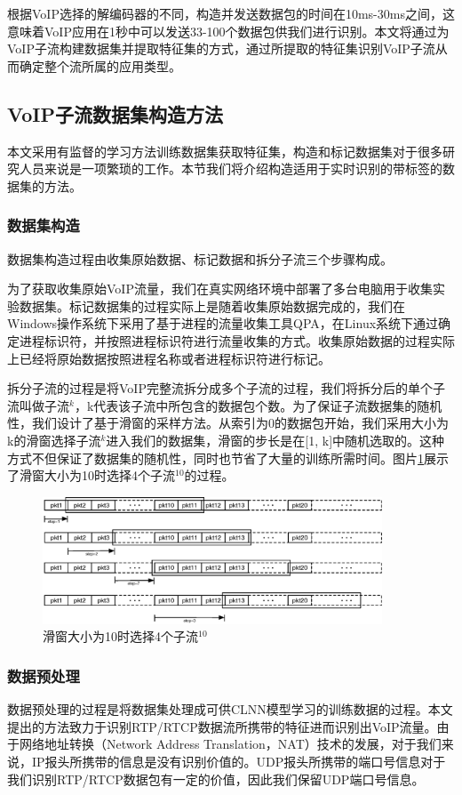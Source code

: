 根据VoIP选择的解编码器的不同，构造并发送数据包的时间在10ms-30ms之间，这意味着VoIP应用在1秒中可以发送33-100个数据包供我们进行识别。本文将通过为VoIP子流构建数据集并提取特征集的方式，通过所提取的特征集识别VoIP子流从而确定整个流所属的应用类型。

\subsection{VoIP子流数据集构造方法}
本文采用有监督的学习方法训练数据集获取特征集，构造和标记数据集对于很多研究人员来说是一项繁琐的工作。本节我们将介绍构造适用于实时识别的带标签的数据集的方法。
\subsubsection{数据集构造}
\label{sec:construct}
数据集构造过程由收集原始数据、标记数据和拆分子流三个步骤构成。

为了获取收集原始VoIP流量，我们在真实网络环境中部署了多台电脑用于收集实验数据集。标记数据集的过程实际上是随着收集原始数据完成的，我们在Windows操作系统下采用了基于进程的流量收集工具QPA，在Linux系统下通过确定进程标识符，并按照进程标识符进行流量收集的方式。收集原始数据的过程实际上已经将原始数据按照进程名称或者进程标识符进行标记。

拆分子流的过程是将VoIP完整流拆分成多个子流的过程，我们将拆分后的单个子流叫做子流$^k$，k代表该子流中所包含的数据包个数。为了保证子流数据集的随机性，我们设计了基于滑窗的采样方法。从索引为0的数据包开始，我们采用大小为k的滑窗选择子流$^k$进入我们的数据集，滑窗的步长是在[1, k]中随机选取的。这种方式不但保证了数据集的随机性，同时也节省了大量的训练所需时间。图片\ref{fig:dataset}展示了滑窗大小为10时选择4个子流$^{10}$的过程。
\begin{figure}[thb]
\begin{center}
\includegraphics[width=0.9\textwidth]{figures/dataset.eps}
\caption{滑窗大小为10时选择4个子流$^{10}$}\label{fig:dataset}
\end{center}
\end{figure}

\subsubsection{数据预处理}
数据预处理的过程是将数据集处理成可供CLNN模型学习的训练数据的过程。本文提出的方法致力于识别RTP/RTCP数据流所携带的特征进而识别出VoIP流量。由于网络地址转换（Network Address Translation，NAT）技术的发展，对于我们来说，IP报头所携带的信息是没有识别价值的。UDP报头所携带的端口号信息对于我们识别RTP/RTCP数据包有一定的价值，因此我们保留UDP端口号信息。

